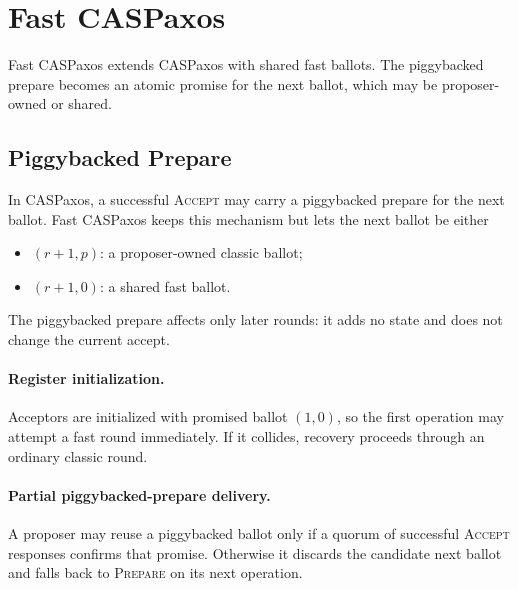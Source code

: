 \section{Fast CASPaxos}
\label{sec:fast-caspaxos}

Fast CASPaxos extends CASPaxos with shared fast ballots.
The piggybacked prepare becomes an atomic promise for the next ballot, which may be proposer-owned or shared.



\subsection{Piggybacked Prepare}
\label{sec:piggybacked-prepare}

In CASPaxos, a successful \textsc{Accept} may carry a piggybacked prepare for the next ballot.
Fast CASPaxos keeps this mechanism but lets the next ballot be either
\begin{itemize}
    \item $(r+1, p)$: a proposer-owned classic ballot;
    \item $(r+1, 0)$: a shared fast ballot.
\end{itemize}

The piggybacked prepare affects only later rounds: it adds no state and does not change the current accept.

\paragraph{Register initialization.}
Acceptors are initialized with promised ballot $(1, 0)$, so the first operation may attempt a fast round immediately.
If it collides, recovery proceeds through an ordinary classic round.

\paragraph{Partial piggybacked-prepare delivery.}
A proposer may reuse a piggybacked ballot only if a quorum of successful \textsc{Accept} responses confirms that promise.
Otherwise it discards the candidate next ballot and falls back to \textsc{Prepare} on its next operation.

